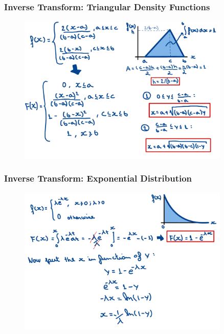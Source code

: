 \begin{frame}
    \frametitle{Inverse Transform: Triangular Density Functions}
    
    \begin{figure}
        \centering
        \includegraphics[width=0.9\textwidth]{sections/prng/figures/triangular_dist_example.pdf}
    \end{figure}
\end{frame}

\begin{frame}
    \frametitle{Inverse Transform: Exponential Distribution}
    \begin{figure}
        \centering
        \includegraphics[width=0.9\textwidth]{sections/prng/figures/exp_dist_example.pdf}
    \end{figure}
\end{frame}


